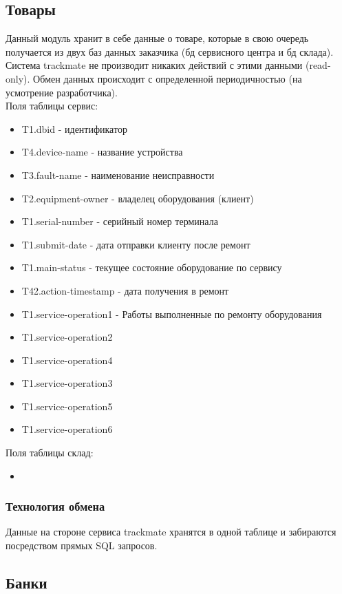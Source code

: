 \documentclass[DIV=calc, paper=a4, fontsize=11pt]{scrartcl} %
\begin{document}
\subsection{Товары}

Данный модуль хранит в себе данные о товаре, которые в свою очередь получается из двух баз данных заказчика (бд сервисного центра и бд склада). Система trackmate не производит никаких действий с этими данными (read-only). Обмен данных происходит с определенной периодичностью (на усмотрение разработчика).
\\[0.5cm]
Поля таблицы сервис:

\begin{itemize}
	\item T1.dbid - идентификатор
	\item T4.device-name - название устройства
	\item T3.fault-name - наименование неисправности
	\item T2.equipment-owner - владелец оборудования (клиент)
	\item T1.serial-number - серийный номер терминала
	\item T1.submit-date - дата отправки клиенту после ремонт
	\item T1.main-status - текущее состояние оборудование по сервису
	\item T42.action-timestamp - дата получения в ремонт
	\item T1.service-operation1 - Работы выполненные по ремонту оборудования
	\item T1.service-operation2
	\item T1.service-operation4
	\item T1.service-operation3
	\item T1.service-operation5
	\item T1.service-operation6
\end{itemize}

Поля таблицы склад:

\begin{itemize}
	\item 
\end{itemize}

\subsubsection{Технология обмена}
Данные на стороне сервиса trackmate хранятся в одной таблице и забираются посредством прямых SQL запросов.

\subsection{Банки}
\end{document}
